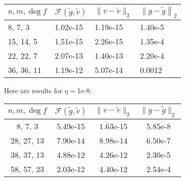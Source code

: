 \documentclass{article}
\begin{document}
\begin{tabular}{|l|l|l|l|}
  \hline
  $n, m, \deg f$ & $\mathcal{F}( \tilde{g}, \tilde{v})$ & $\| v - \tilde{v}
  \|_2$ & $\left. \| g - \tilde{g} \right\|_2$\\
  \hline
  8, 7, 3 & 1.02e-15 & 1.19e-15 & 1.40e-5\\
  \hline
  15, 14, 5 & 1.51e-15 & 2.26e-15 & 1.35e-4\\
  \hline
  22, 22, 7 & 2.07e-13 & 1.40e-13 & 2.20e-4\\
  \hline
  36, 36, 11 & 1.19e-12 & 5.07e-14 & 0.0012\\
  \hline
\end{tabular}





Here are results for $\eta =$1e-8:



\begin{tabular}{|c|c|c|c|}
  \hline
  $n, m, \deg f$ & $\mathcal{F}( \tilde{g}, \tilde{v})$ & $\| v - \tilde{v}
  \|_2$ & $\| g - \tilde{g} \|_2$\\
  \hline
  8, 7, 3 & 5.49e-15 & 1.63e-15 & 5.85e-8\\
  \hline
  28, 27, 13 & 7.90e-14 & 8.98e-14 & 6.50e-7\\
  \hline
  38, 37, 13 & 4.88e-12 & 4.26e-12 & 2.30e-5\\
  \hline
  58, 57, 23 & 2.03e-12 & 4.40e-12 & 2.54e-4\\
  \hline
\end{tabular}
\end{document}

